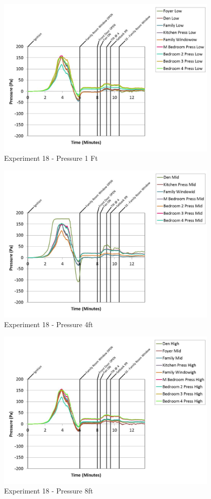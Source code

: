 \documentclass{article}
\begin{document}
\begin{appendices}
	\begin{figure}[h!]
		\centering
		\includegraphics[height=3.05in]{0_Images/Results_Charts/Exp_18_Charts/Pressure1Ft.pdf}
		\caption{Experiment 18 - Pressure 1 Ft}
	\end{figure}
 
	\clearpage

	\begin{figure}[h!]
		\centering
		\includegraphics[height=3.05in]{0_Images/Results_Charts/Exp_18_Charts/Pressure4ft.pdf}
		\caption{Experiment 18 - Pressure 4ft}
	\end{figure}
 

	\begin{figure}[h!]
		\centering
		\includegraphics[height=3.05in]{0_Images/Results_Charts/Exp_18_Charts/Pressure8ft.pdf}
		\caption{Experiment 18 - Pressure 8ft}
	\end{figure}
 

\end{appendices}
\end{document}
